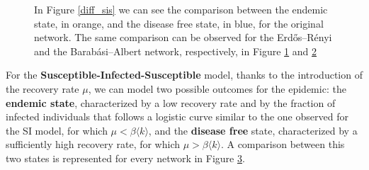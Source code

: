 \begin{figure}[H]
\begin{subfigure}{0.45\textwidth}
{            }
            \caption{}
            \label{diff_sis_er}
        \end{subfigure}
        \begin{subfigure}{0.45\textwidth}
            \caption{}
            \label{diff_sis_ba}
        \end{subfigure}
        \caption{In Figure \ref{diff_sis} we can see the comparison between the endemic state, in orange, and the
        disease free state, in blue, for the original network. The same comparison can be observed for the
        Erdős–Rényi and the Barabási–Albert network, respectively, in Figure \ref{diff_sis_er} and
        \ref{diff_sis_ba}}
        \label{diff_sis_total}
    \end{figure}
    For the \textbf{Susceptible-Infected-Susceptible} model, thanks to the introduction of the recovery rate $\mu$,
    we can model two possible outcomes for the epidemic: the \textbf{endemic state}, characterized by a low recovery
    rate and by the fraction of infected individuals that follows a logistic curve similar to the one observed for
    the SI model, for which $\mu < \beta\langle k \rangle$, and the \textbf{disease free} state, characterized by a
    sufficiently high recovery rate, for which $\mu > \beta\langle k \rangle$. A comparison between this two states
    is represented for every network in Figure \ref{diff_sis_total}.


